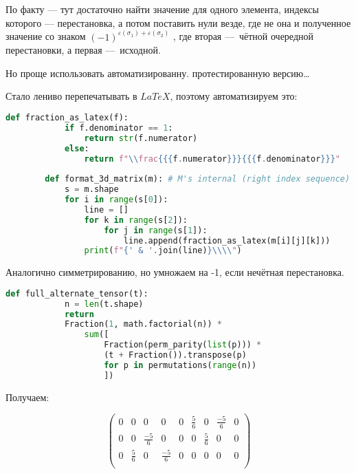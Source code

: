 \documentclass[12pt, a4paper]{article}
\newcommand\arr[2]{\left(\begin{array}{#1}#2\end{array}\right)}
\begin{document}
    По факту — тут достаточно найти значение для одного элемента, индексы которого — перестановка, 
    а потом поставить нули везде, где не она и полученное значение со знаком $(-1)^{\varepsilon(\sigma_1) + \varepsilon(\sigma_2)}$
    , где вторая — чётной очередной перестановки, а первая — исходной.

    Но проще использовать автоматизированну. протестированную версию…


    Стало лениво перепечатывать в $LaTeX$, поэтому автоматизируем это:

    \begin{lstlisting}[language=Python]
        def fraction_as_latex(f):
            if f.denominator == 1:
                return str(f.numerator)
            else:
                return f"\\frac{{{f.numerator}}}{{{f.denominator}}}"
    
        def format_3d_matrix(m): # M's internal (right index sequence)
            s = m.shape
            for i in range(s[0]):
                line = []
                for k in range(s[2]):
                    for j in range(s[1]):
                        line.append(fraction_as_latex(m[i][j][k]))
                print(f"{' & '.join(line)}\\\\")
    \end{lstlisting}



    Аналогично симметрированию, но умножаем на -1, если нечётная перестановка.

    \begin{lstlisting}[language=Python]
        def full_alternate_tensor(t):
            n = len(t.shape)
	        return 
            Fraction(1, math.factorial(n)) * 
                sum([
                    Fraction(perm_parity(list(p))) * 
                    (t + Fraction()).transpose(p) 
                    for p in permutations(range(n))
                    ])
    \end{lstlisting}

    Получаем:

    \begin{equation}
        \arr{ccc|ccc|ccc}{
            0 & 0 & 0 & 0 & 0 & \frac{5}{6} & 0 & \frac{-5}{6} & 0\\
            0 & 0 & \frac{-5}{6} & 0 & 0 & 0 & \frac{5}{6} & 0 & 0\\
            0 & \frac{5}{6} & 0 & \frac{-5}{6} & 0 & 0 & 0 & 0 & 0\\
        }
    \end{equation}
\end{document}
